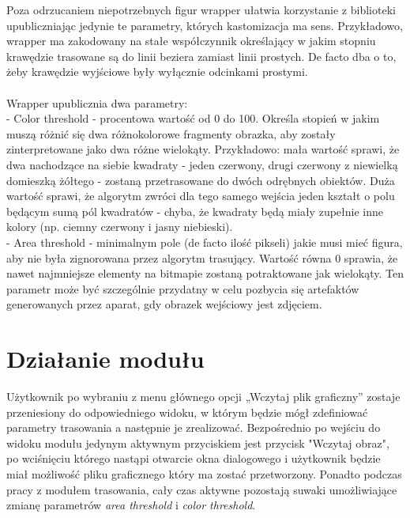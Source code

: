 \documentclass{article}
\let\oldsection\section
\renewcommand\section{\clearpage\oldsection} %
\begin{document}
Poza odrzucaniem niepotrzebnych figur wrapper ułatwia korzystanie z biblioteki upubliczniając jedynie te parametry, których kastomizacja ma sens. Przykładowo, wrapper ma zakodowany na stałe współczynnik określający w jakim stopniu krawędzie trasowane są do linii beziera zamiast linii prostych. De facto dba o to, żeby krawędzie wyjściowe były wyłącznie odcinkami prostymi.
\\\\Wrapper upublicznia dwa parametry:
\\- Color threshold - procentowa wartość od 0 do 100. Określa stopień w jakim muszą różnić się dwa różnokolorowe fragmenty obrazka, aby zostały zinterpretowane jako dwa różne wielokąty. Przykładowo: mała wartość sprawi, że dwa nachodzące na siebie kwadraty - jeden czerwony, drugi czerwony z niewielką domieszką żółtego - zostaną przetrasowane do dwóch odrębnych obiektów. Duża wartość sprawi, że algorytm zwróci dla tego samego wejścia jeden kształt o polu będącym sumą pól kwadratów - chyba, że kwadraty będą miały zupełnie inne kolory (np. ciemny czerwony i jasny niebieski).
\\- Area threshold - minimalnym pole (de facto ilość pikseli) jakie musi mieć figura, aby nie była zignorowana przez algorytm trasujący. Wartość równa 0 sprawia, że nawet najmniejsze elementy na bitmapie zostaną potraktowane jak wielokąty. Ten parametr może być szczególnie przydatny w celu pozbycia się artefaktów generowanych przez aparat, gdy obrazek wejściowy jest zdjęciem.

\section{Działanie modułu}
	
Użytkownik po wybraniu z menu głównego opcji „Wczytaj plik graficzny” zostaje przeniesiony do odpowiedniego widoku, w którym będzie mógł zdefiniować parametry trasowania a następnie je zrealizować. Bezpośrednio po wejściu do widoku modułu jedynym aktywnym przyciskiem jest przycisk "Wczytaj obraz", po wciśnięciu którego nastąpi otwarcie okna dialogowego i użytkownik będzie miał możliwość pliku graficznego który ma zostać przetworzony. Ponadto podczas pracy z modułem trasowania, cały czas aktywne pozostają suwaki umożliwiające zmianę parametrów \textit{area threshold} i \textit{color threshold}.
\end{document}
